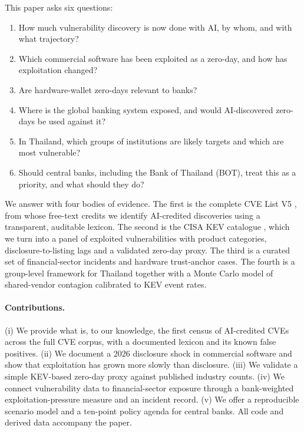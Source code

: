 \documentclass[11pt,a4paper]{article}
\begin{document}
This paper asks six questions:
\begin{enumerate}[label=\textbf{RQ\arabic*.},leftmargin=3.2em]
\item How much vulnerability discovery is now done with AI, by whom, and with what trajectory?
\item Which commercial software has been exploited as a zero-day, and how has exploitation changed?
\item Are hardware-wallet zero-days relevant to banks?
\item Where is the global banking system exposed, and would AI-discovered zero-days be used against it?
\item In Thailand, which groups of institutions are likely targets and which are most vulnerable?
\item Should central banks, including the Bank of Thailand (BOT), treat this as a priority, and what should they do?
\end{enumerate}

We answer with four bodies of evidence. The first is the complete CVE List V5 \citep{cveprogram2026}, from whose free-text credits we identify AI-credited discoveries using a transparent, auditable lexicon. The second is the CISA KEV catalogue \citep{cisa2026kev}, which we turn into a panel of exploited vulnerabilities with product categories, disclosure-to-listing lags and a validated zero-day proxy. The third is a curated set of financial-sector incidents and hardware trust-anchor cases. The fourth is a group-level framework for Thailand together with a Monte Carlo model of shared-vendor contagion calibrated to KEV event rates.

\paragraph{Contributions.} (i) We provide what is, to our knowledge, the first census of AI-credited CVEs across the full CVE corpus, with a documented lexicon and its known false positives. (ii) We document a 2026 disclosure shock in commercial software and show that exploitation has grown more slowly than disclosure. (iii) We validate a simple KEV-based zero-day proxy against published industry counts. (iv) We connect vulnerability data to financial-sector exposure through a bank-weighted exploitation-pressure measure and an incident record. (v) We offer a reproducible scenario model and a ten-point policy agenda for central banks. All code and derived data accompany the paper.
\end{document}
